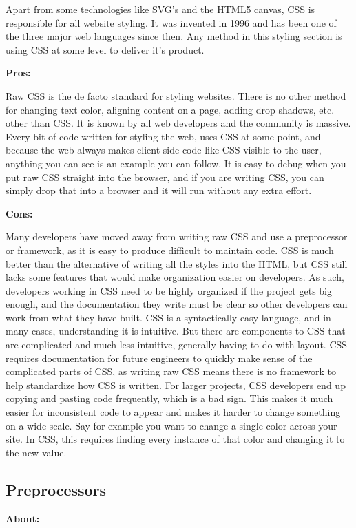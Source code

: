\documentclass[draftclsnofoot,onecolumn,letterpaper,10pt,compsoc]{IEEEtran}
\begin{document}
    Apart from some technologies like SVG's and the HTML5 canvas, CSS is responsible for all website styling.
    It was invented in 1996 and has been one of the three major web languages since then.
    Any method in this styling section is using CSS at some level to deliver it's product.\cite{CSSHistory}

    \noindent \textbf{Pros:}

    Raw CSS is the de facto standard for styling websites.
    There is no other method for changing text color, aligning content on a page, adding drop shadows, etc. other than CSS.
    It is known by all web developers and the community is massive.
    Every bit of code written for styling the web, uses CSS at some point, and because the web always makes client side code like CSS visible to the user, anything you can see is an example you can follow.
    It is easy to debug when you put raw CSS straight into the browser, and if you are writing CSS, you can simply drop that into a browser and it will run without any extra effort.\cite{CSSProCon}

    \noindent \textbf{Cons:}

    Many developers have moved away from writing raw CSS and use a preprocessor or framework, as it is easy to produce difficult to maintain code.
    CSS is much better than the alternative of writing all the styles into the HTML, but CSS still lacks some features that would make organization easier on developers.
    As such, developers working in CSS need to be highly organized if the project gets big enough, and the documentation they write must be clear so other developers can work from what they have built.
    CSS is a syntactically easy language, and in many cases, understanding it is intuitive.
    But there are components to CSS that are complicated and much less intuitive, generally having to do with layout.\cite{CSSProCon}
    CSS requires documentation for future engineers to quickly make sense of the complicated parts of CSS, as writing raw CSS means there is no framework to help standardize how CSS is written.
    For larger projects, CSS developers end up copying and pasting code frequently, which is a bad sign.
    This makes it much easier for inconsistent code to appear and makes it harder to change something on a wide scale.
    Say for example you want to change a single color across your site.
    In CSS, this requires finding every instance of that color and changing it to the new value.

  \subsection{Preprocessors}
    \textbf{About:}
\end{document}
